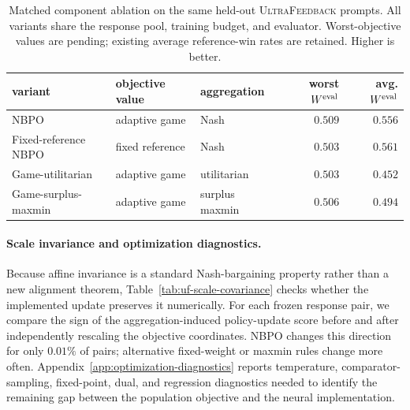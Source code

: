 \documentclass{article}
\theoremstyle{remark}
\theoremstyle{plain}
\newcommand{\NBPO}{\textsc{NBPO}}
\begin{document}
\begin{table}[t]
\centering\footnotesize
\setlength{\tabcolsep}{2.8pt}
\caption{Matched component ablation on the same held-out \textsc{UltraFeedback} prompts. All variants share the response pool, training budget, and evaluator. Worst-objective values are pending; existing average reference-win rates are retained. Higher is better.}
\label{tab:component-ablation}
\begin{tabular}{lllrr}
\toprule
variant & objective value & aggregation & worst $W^{\rm eval}$ & avg. $W^{\rm eval}$\\
\midrule
\NBPO{} & adaptive game & Nash & $0.509$ & $0.556$\\
Fixed-reference NBPO & fixed reference & Nash & $0.503$ & $0.561$\\
Game-utilitarian & adaptive game & utilitarian & $0.503$ & $0.452$\\
Game-surplus-maxmin & adaptive game & surplus maxmin & $0.506$ & $0.494$\\
\bottomrule
\end{tabular}
\end{table}

\paragraph{Scale invariance and optimization diagnostics.}
Because affine invariance is a standard Nash-bargaining property rather than a new alignment theorem, Table~\ref{tab:uf-scale-covariance} checks whether the implemented update preserves it numerically. For each frozen response pair, we compare the sign of the aggregation-induced policy-update score before and after independently rescaling the objective coordinates. \NBPO{} changes this direction for only $0.01\%$ of pairs; alternative fixed-weight or maxmin rules change more often. Appendix~\ref{app:optimization-diagnostics} reports temperature, comparator-sampling, fixed-point, dual, and regression diagnostics needed to identify the remaining gap between the population objective and the neural implementation.
\end{document}
